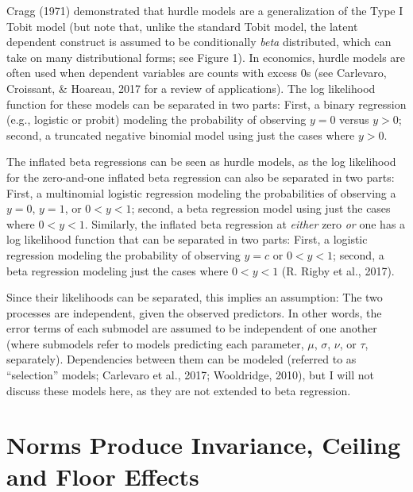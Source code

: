\documentclass[english,man]{apa6}
\theoremstyle{definition}
\theoremstyle{definition}
\theoremstyle{remark}
\begin{document}
Cragg (1971) demonstrated that hurdle models are a generalization of the
Type I Tobit model (but note that, unlike the standard Tobit model, the
latent dependent construct is assumed to be conditionally \emph{beta}
distributed, which can take on many distributional forms; see Figure 1).
In economics, hurdle models are often used when dependent variables are
counts with excess 0s (see Carlevaro, Croissant, \& Hoareau, 2017 for a
review of applications). The log likelihood function for these models
can be separated in two parts: First, a binary regression (e.g.,
logistic or probit) modeling the probability of observing \(y = 0\)
versus \(y > 0\); second, a truncated negative binomial model using just
the cases where \(y > 0\).

The inflated beta regressions can be seen as hurdle models, as the log
likelihood for the zero-and-one inflated beta regression can also be
separated in two parts: First, a multinomial logistic regression
modeling the probabilities of observing a \(y = 0\), \(y = 1\), or
\(0 < y < 1\); second, a beta regression model using just the cases
where \(0 < y < 1\). Similarly, the inflated beta regression at
\emph{either} zero \emph{or} one has a log likelihood function that can
be separated in two parts: First, a logistic regression modeling the
probability of observing \(y = c\) or \(0 < y < 1\); second, a beta
regression modeling just the cases where \(0 < y < 1\) (R. Rigby et al.,
2017).

Since their likelihoods can be separated, this implies an assumption:
The two processes are independent, given the observed predictors. In
other words, the error terms of each submodel are assumed to be
independent of one another (where submodels refer to models predicting
each parameter, \(\mu\), \(\sigma\), \(\nu\), or \(\tau\), separately).
Dependencies between them can be modeled (referred to as ``selection''
models; Carlevaro et al., 2017; Wooldridge, 2010), but I will not
discuss these models here, as they are not extended to beta regression.

\section{Norms Produce Invariance, Ceiling and Floor
Effects}\label{norms-produce-invariance-ceiling-and-floor-effects}
\end{document}
